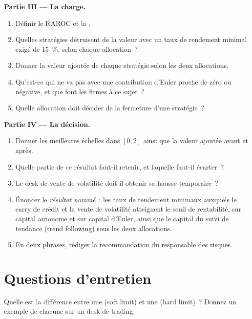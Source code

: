\begin{problem}
\medskip\noindent\textbf{Partie III --- La charge.}
\begin{enumerate}[resume]
\item Définir le RAROC et la .
\item Quelles stratégies détruisent de la valeur avec un taux de rendement minimal exigé de 15~\%, selon chaque allocation~?
\item Donner la valeur ajoutée de chaque stratégie selon les deux allocations.
\item Qu'est-ce qui ne va pas avec une contribution d'Euler proche de zéro ou négative, et que font les firmes à ce sujet~?
\item Quelle allocation doit décider de la fermeture d'une stratégie~?
\end{enumerate}

\medskip\noindent\textbf{Partie IV --- La décision.}
\begin{enumerate}[resume]
\item Donner les meilleures échelles dans $[0,2]$ ainsi que la valeur ajoutée avant et après.
\item Quelle partie de ce résultat faut-il retenir, et laquelle faut-il écarter~?
\item Le desk de vente de volatilité doit-il obtenir sa hausse temporaire~?
\item Énoncer le \emph{résultat nommé}~: les taux de rendement minimaux auxquels le carry de crédit et la vente de volatilité atteignent le seuil de rentabilité, sur capital autonome et sur capital d'Euler, ainsi que
le capital du suivi de tendance (trend following) sous les deux allocations.
\item En deux phrases, rédiger la recommandation du responsable des risques.
\end{enumerate}
\end{problem}

\section{Questions d'entretien}

\begin{interviewq}\label{iq:fm:limits-and-capital-allocation:1}
Quelle est la différence entre une  (soft limit) et une  (hard limit)~? Donnez un exemple de chacune sur un desk de trading.
\end{interviewq}

